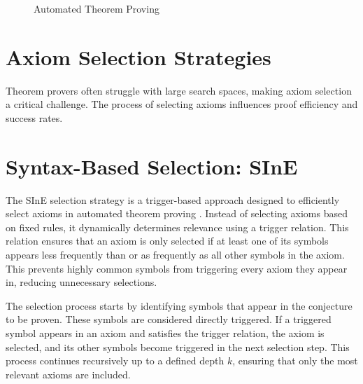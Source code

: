 \documentclass[english,version-2020-11]{uzl-thesis}
\begin{document}
\begin{figure}[ht]
    \caption {Automated Theorem Proving}
    \label{fig:automatedTheoremProving}
\end{figure}


\section{Axiom Selection Strategies}

Theorem provers often struggle with large search spaces, making axiom selection a critical challenge. The process of selecting axioms influences proof efficiency and success rates.

\section{Syntax-Based Selection: SInE}

The SInE selection strategy is a trigger-based approach designed to efficiently select axioms in automated theorem proving \cite{Hoder2011}. Instead of selecting axioms based on fixed rules, it dynamically determines relevance using a trigger relation. This relation ensures that an axiom is only selected if at least one of its symbols appears less frequently than or as frequently as all other symbols in the axiom. This prevents highly common symbols from triggering every axiom they appear in, reducing unnecessary selections.

The selection process starts by identifying symbols that appear in the conjecture to be proven. These symbols are considered directly triggered. If a triggered symbol appears in an axiom and satisfies the trigger relation, the axiom is selected, and its other symbols become triggered in the next selection step. This process continues recursively up to a defined depth \( k \), ensuring that only the most relevant axioms are included.
\end{document}
